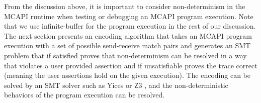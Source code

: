 From the discussion above, it is important to consider non-determinism in the MCAPI runtime when testing or debugging an MCAPI program execution. Note that we use infinite-buffer for the program execution in the rest of our discussion. The next section presents an encoding algorithm that takes an MCAPI program execution with a set of possible send-receive match pairs and generates an SMT problem that if satisfied proves that non-determinism can be resolved in a way that violates a user provided assertion and if unsatisfiable proves the trace correct (meaning the user assertions hold on the given execution). The encoding can be solved by an SMT solver such as Yices \cite{dutertre:CAV06} or Z3 \cite{demoura:tacas08}, and the non-deterministic behaviors of the program execution can be resolved.



